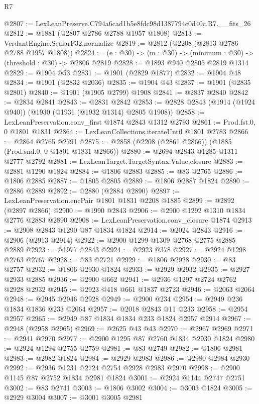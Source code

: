 \begin{lexlean}{R7}
\begin{coremodule}
@2807 := LexLeanPreserve.C794a6cad1b5e8fdc98d1387794c0d40c.R7.__fits_26
@2812 := @1881 (@2807 @2786 @2788 @1957 @1808)
@2813 := VerdantEngine.ScalarF32.normalize
@2819 := @2812 (@2208 (@2813 @2786 @2788 @1957 @1808))
@2824 := (e : @30) -> (m : @30) -> (minimum : @30) -> (threshold : @30) -> @2806 @2819
@2828 := @1893 @940 @2805 @2819 @1314
@2829 := @1904 @53
@2831 := @1901 (@2829 @1877)
@2832 := @1904 @48
@2834 := @1901 (@2832 @2036)
@2835 := @1904 @43
@2837 := @1901 (@2835 @2801)
@2840 := @1901 (@1905 @2799) @1908
@2841 := @2837 @2840
@2842 := @2834 @2841
@2843 := @2831 @2842
@2853 := @2828 @2843 (@1914 (@1924 @940)) (@1930 (@1931 (@1932 @1314) @2805 @1908))
@2858 := LexLeanPreservation.conv_first @1874 @2843 @1312 @2793
@2861 := Prod.fst.{0, 0} @1801 @1831
@2864 := LexLeanCollections.iterateUntil @1801 @2783
@2866 := @2864 @2765 @2791
@2875 := @2858 (@2208 (@2861 @2866)) (@1885 (Prod.snd.{0, 0} @1801 @1831 @2866))
@2880 := @2694 @2843 @1285 @1311 @2777 @2792
@2881 := LexLeanTarget.TargetSyntax.Value.closure
@2883 := @2881 @1290 @1824
@2884 := @1806 @2883
@2885 := @83 @2765
@2886 := @1806 @2885
@2887 := @1805 @2805
@2889 := @1806 @2887 @1824
@2890 := @2886 @2889
@2892 := @2880 (@2884 @2890)
@2897 := LexLeanPreservation.encPair @1801 @1831 @2208 @1885
@2899 := @2892 (@2897 @2866)
@2900 := @1990 @2843
@2906 := @2900 @1292 @1310 @1834 @2776 @2883 @2890
@2908 := LexLeanPreservation.conv_closure @1874
@2913 := @2908 @2843 @1290 @87 @1834 @1824
@2914 := @2024 @2843
@2916 := @2906 (@2913 @2914)
@2922 := @2900 @1299 @1309 @2768 @2775 @2885 @2889
@2923 := @1977 @2843
@2924 := @2923 @378
@2927 := @2924 @1298 @2763 @2767
@2928 := @83 @2721
@2929 := @1806 @2928
@2930 := @83 @2757
@2932 := @1806 @2930 @1824
@2933 := @2929 @2932
@2935 := @2927 @2933 @2885
@2936 := @2900 @662
@2941 := @2936 @1297 @2724 @2762 @2928 @2932
@2945 := @2923 @418 @661 @1837 @2723
@2946 := @2063 @2064
@2948 := @2945 @2946 @2928
@2949 := @2900 @234
@2954 := @2949 @236 @1834 @1836 @233 @2064
@2957 := @2018 @2843 @11 @233
@2958 := @2954 @2957
@2965 := @2949 @87 @1834 @1834 @233 @1824 @2957 @2914
@2967 := @2948 (@2958 @2965)
@2969 := @2625 @43 @43
@2970 := @2967 @2969
@2971 := @2941 @2970
@2977 := @2900 @1295 @87 @2760 @1834 @2930 @1824
@2980 := @2924 @1294 @2755 @2759
@2981 := @83 @2749
@2982 := @1806 @2981
@2983 := @2982 @1824
@2984 := @2929 @2983
@2986 := @2980 @2984 @2930
@2992 := @2936 @1231 @2724 @2754 @2928 @2983 @2970
@2998 := @2900 @1145 @87 @2752 @1834 @2981 @1824
@3001 := @2924 @1144 @2747 @2751
@3002 := @83 @2741
@3003 := @1806 @3002
@3004 := @3003 @1824
@3005 := @2929 @3004
@3007 := @3001 @3005 @2981

\end{coremodule}
\end{lexlean}
